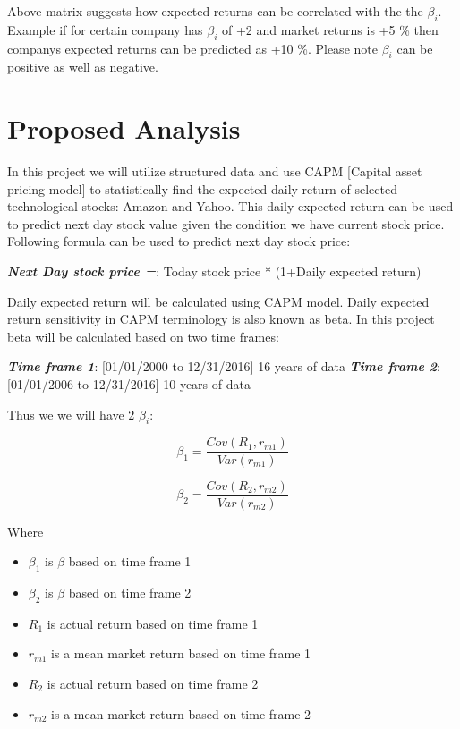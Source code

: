\indent

Above matrix suggests how expected returns can be correlated with the the $\beta_{i}$. Example if for certain company has $\beta_{i}$ of +2 and 
market returns is +5 \% then company\textquotesingle s expected returns can be predicted as +10 \%. Please note $\beta_{i}$ can be positive as well as negative. 

                
                
\section{Proposed Analysis}
 
\indent

In this project we will utilize structured data and use CAPM [Capital asset pricing model] to statistically find the expected daily return of selected technological stocks: Amazon and Yahoo.
This daily expected return can be used to predict next day stock value given the condition we have current stock price. 
Following formula can be used to predict next day stock price:


\begin{algorithm}
\textbf{\textit{Next Day stock price =}}: Today stock price * (1+Daily expected return)\newline
\end{algorithm}

\indent
Daily expected return will be calculated using CAPM model. Daily expected return sensitivity in CAPM terminology is also known as beta. In this project beta will be calculated 
based on two time frames:

\begin{algorithm}
\textbf{\textit{Time frame 1}}: [01/01/2000 to 12/31/2016] 16 years of data\newline
\textbf{\textit{Time frame 2}}: [01/01/2006 to 12/31/2016] 10 years of data\newline
\end{algorithm}

\indent
Thus we we will have 2 $\beta_{i}$:

$$\beta_{1}  = \frac{Cov(R_{1},r_{m1})}{Var(r_{m1})}$$

\indent 
$$\beta_{2}  = \frac{Cov(R_{2},r_{m2})}{Var(r_{m2})}$$

\indent
Where
\indent

\begin{itemize} 
\item $\beta_{1}$ is $\beta$ based on time frame 1
\item $\beta_{2}$ is $\beta$ based on time frame 2
\item $R_{1}$ is actual return  based on time frame 1
\item $r_{m1}$ is a mean market return based on time frame 1
\item $R_{2}$ is actual return  based on time frame 2
\item $r_{m2}$ is a mean market return based on time frame 2
\end{itemize}

